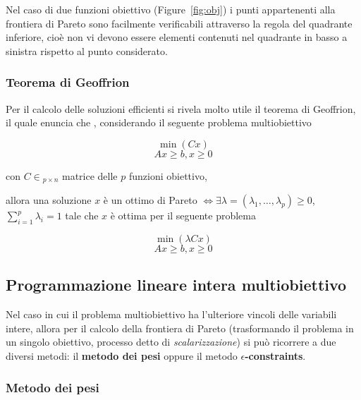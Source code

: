 Nel caso di due funzioni obiettivo (Figure~\ref{fig:obj}) i punti appartenenti 
alla frontiera di Pareto sono facilmente verificabili attraverso la regola del quadrante
inferiore, cioè non vi devono essere elementi contenuti nel quadrante in basso a sinistra 
rispetto al punto considerato.

\subsubsection{Teorema di Geoffrion}
\label{section:geoffrion}

Per il calcolo delle soluzioni efficienti si rivela molto utile il teorema di Geoffrion, il
quale enuncia che \cite{Figueira2006}, considerando il seguente problema multiobiettivo

\begin{equation*}
    \min (Cx)    
    \label{eq:}
\end{equation*}
\begin{equation}
    Ax \geq b, x \geq 0
    \label{eq:multi_problem}
\end{equation}

\noindent
con $C \in $\Rset$_{p \times n}$ matrice delle $p$ funzioni obiettivo,

allora una soluzione $x$ è un ottimo di Pareto $\iff \exists \lambda = (\lambda_1, \dots, 
\lambda_p) \geq 0$, $\sum_{i=1}^{p} \lambda_i = 1$ tale che $x$ è ottima per il seguente 
problema

\begin{equation*}
    \min (\lambda Cx)    
    \label{eq:}
\end{equation*}
\begin{equation*}
    Ax \geq b, x \geq 0
    \label{eq:}
\end{equation*}

\subsection{Programmazione lineare intera multiobiettivo}
\label{section:plimo}

Nel caso in cui il problema multiobiettivo ha l'ulteriore vincoli delle variabili intere,
allora per il calcolo della frontiera di Pareto (trasformando il problema in un singolo 
obiettivo, processo detto di \textit{scalarizzazione}) si può ricorrere a due diversi metodi: 
il \textbf{metodo dei pesi} oppure il metodo \textbf{$\epsilon$-constraints}. 

\subsubsection{Metodo dei pesi}
\label{section:weight_method}

